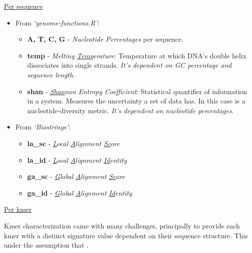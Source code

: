 \documentclass[
  letterpaper,
]{article}
\providecommand{\tightlist}{%
  \setlength{\itemsep}{0pt}\setlength{\parskip}{0pt}}\usepackage{longtable,booktabs,array}
\begin{document}
\underline{Per sequence}

\begin{itemize}
\tightlist
\item
  From \emph{`genome-functions.R'}:

  \begin{itemize}
  \item
    \textbf{A, T, C, G} - \emph{Nucleotide Percentages} per sequence.
  \item
    \textbf{temp} - \textit{Melting \underline{Temp}erature}:
    Temperature at which DNA's double helix dissociates into single
    strands. \emph{It's dependent on GC percentage and sequence length.}
  \item
    \textbf{shan} - \textit{\underline{Shan}non Entropy Coefficient}:
    Statistical quantifier of information in a system. Measures the
    uncertainty a set of data has. In this case is a
    nucleotide-diversity metric. \emph{It's dependent on nucleotide
    percentages.}
  \end{itemize}
\item
  From \emph{`Biostrings'}:

  \begin{itemize}
  \item
    \color{red}\textbf{la\_sc} \color{black} -
    \textit{\underline{L}ocal \underline{A}lignment \underline{Sc}ore}
  \item
    \color{red}\textbf{la\_id} \color{black} -
    \textit{\underline{L}ocal \underline{A}lignment \underline{Id}entity}
  \item
    \color{red}\textbf{ga\_sc} \color{black} -
    \textit{\underline{G}lobal \underline{A}lignment \underline{Sc}ore}
  \item
    \color{red}\textbf{ga\_id} \color{black} -
    \textit{\underline{G}lobal \underline{A}lignment \underline{Id}entity}
  \end{itemize}
\end{itemize}

\underline{Per kmer}

Kmer characterization came with many challenges, principally to provide
each kmer with a distinct signature value dependent on their sequence
structure. This under the assumption that .
\end{document}
